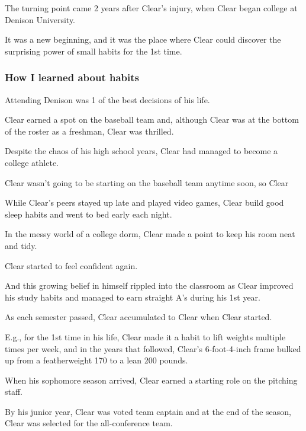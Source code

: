 \documentclass[oneside]{article}
\numberwithin{equation}{section}
\begin{document}
The turning point came 2 years after Clear's injury, when Clear began college at Denison University.

It was a new beginning, and it was the place where Clear could discover the surprising power of small habits for the 1st time.

\subsubsection*{How I learned about habits}
Attending Denison was 1 of the best decisions of his life.

Clear earned a spot on the baseball team and, although Clear was at the bottom of the roster as a freshman, Clear was thrilled.

Despite the chaos of his high school years, Clear had managed to become a college athlete.

%
Clear wasn't going to be starting on the baseball team anytime soon, so Clear 

While Clear's peers stayed up late and played video games, Clear build good sleep habits and went to bed early each night.

In the messy world of a college dorm, Clear made a point to keep his room neat and tidy.


Clear started to feel confident again.

And this growing belief in himself rippled into the classroom as Clear improved his study habits and managed to earn straight A's during his 1st year.

%

As each semester passed, Clear accumulated  to Clear when Clear started.

E.g., for the 1st time in his life, Clear made it a habit to lift weights multiple times per week, and in the years that followed, Clear's 6-foot-4-inch frame bulked up from a featherweight 170 to a lean 200 pounds.

%
When his sophomore season arrived, Clear earned a starting role on the pitching staff.

By his junior year, Clear was voted team captain and at the end of the season, Clear was selected for the all-conference team.
\end{document}
